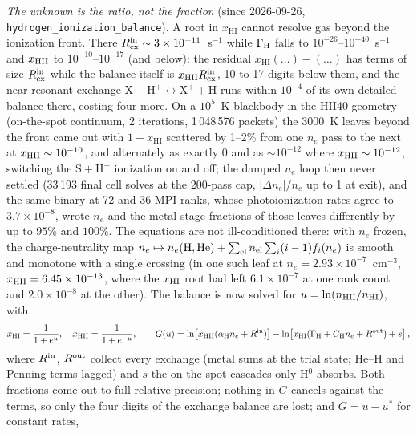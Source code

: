 \documentclass[english,a4paper]{my_memo}
\newcommand{\code}[1]{\texttt{#1}}
\newcommand{\xHI}{x_{\mathrm{HI}}}
\begin{document}
\emph{The unknown is the ratio, not the fraction} (since 2026-09-26,
\code{hydrogen\_ionization\_balance}).  A root in $\xHI$ cannot resolve
gas beyond the ionization front.  There $R_{\rm cx}^{\rm in}\sim
3\times10^{-11}$~s$^{-1}$ while $\Gamma_{\rm H}$ falls to
$10^{-26}$--$10^{-40}$~s$^{-1}$ and $x_{\rm HII}$ to $10^{-10}$--$10^{-17}$
(and below): the residual $\xHI(\ldots) - (\ldots)$ has terms of size
$R_{\rm cx}^{\rm in}$ while the balance itself is $x_{\rm HII}
R_{\rm cx}^{\rm in}$, 10 to 17 digits below them, and the near-resonant
exchange $\mathrm{X} + \mathrm{H}^+ \leftrightarrow \mathrm{X}^+ +
\mathrm{H}$ runs within $10^{-4}$ of its own detailed balance there, costing
four more.  On a $10^5$~K blackbody in the HII40 geometry (on-the-spot
continuum, 2 iterations, 1\,048\,576 packets) the 3000~K leaves beyond
the front came out with $1-\xHI$ scattered by 1--2\% from one $n_e$ pass
to the next at $x_{\rm HII}\sim10^{-10}$, and alternately as exactly 0 and
as $\sim10^{-12}$ where $x_{\rm HII}\sim10^{-12}$, switching the
$\mathrm{S}+\mathrm{H}^+$ ionization on and off; the damped $n_e$ loop then
never settled (33\,193 final cell solves at the 200-pass cap, $|\Delta
n_e|/n_e$ up to 1 at exit), and the same binary at 72 and 36 MPI ranks,
whose photoionization rates agree to $3.7\times10^{-8}$, wrote $n_e$ and
the metal stage fractions of those leaves differently by up to $95\%$ and
$100\%$.  The equations are not ill-conditioned there: with $n_e$ frozen,
the charge-neutrality map $n_e \mapsto n_e(\mathrm{H,He}) +
\sum_{\rm el} n_{\rm el}\sum_i (i-1) f_i(n_e)$ is smooth and monotone with a
single crossing (in one such leaf at $n_e = 2.93\times10^{-7}$~cm$^{-3}$,
$x_{\rm HII} = 6.45\times10^{-13}$, where the $x_{\rm HI}$ root had left
$6.1\times10^{-7}$ at one rank count and $2.0\times10^{-8}$ at the other).
The balance is now solved for $u = \ln(n_{\rm HII}/n_{\rm HI})$, with
\begin{equation}
  \xHI = \frac{1}{1+e^{u}}, \quad x_{\rm HII} = \frac{1}{1+e^{-u}}, \qquad
  G(u) = \ln\!\left[x_{\rm HII}(\alpha_{\rm H}n_e + R^{\rm in})\right]
       - \ln\!\left[\xHI(\Gamma_{\rm H} + C_{\rm H}n_e + R^{\rm out}) + s\right],
  \label{eq:hbalance-u}
\end{equation}
where $R^{\rm in}$, $R^{\rm out}$ collect every exchange (metal sums at the
trial state; He--H and Penning terms lagged) and $s$ the on-the-spot
cascades only H$^0$ absorbs.  Both fractions come out to full relative
precision; nothing in $G$ cancels against the terms, so only the four digits
of the exchange balance are lost; and $G = u - u^\ast$ for constant rates,
\end{document}
